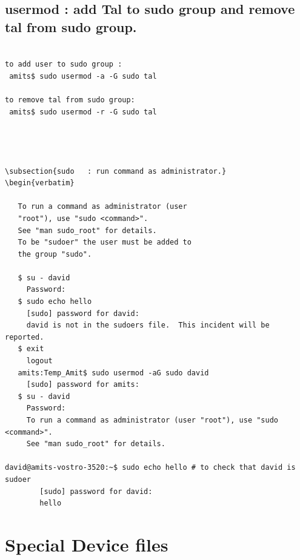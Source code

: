\documentclass[a4paper,12pt]{article}
\begin{document}
\subsection{usermod : add Tal to sudo group and remove tal from sudo group.}
\begin{verbatim}

to add user to sudo group : 
 amits$ sudo usermod -a -G sudo tal

to remove tal from sudo group:
 amits$ sudo usermod -r -G sudo tal
  



\subsection{sudo   : run command as administrator.}
\begin{verbatim}
       
   To run a command as administrator (user   
   "root"), use "sudo <command>".
   See "man sudo_root" for details.
   To be "sudoer" the user must be added to 
   the group "sudo".
   
   $ su - david
     Password: 
   $ sudo echo hello
     [sudo] password for david: 
     david is not in the sudoers file.  This incident will be reported.
   $ exit 
     logout
   amits:Temp_Amit$ sudo usermod -aG sudo david
     [sudo] password for amits: 
   $ su - david
     Password: 
     To run a command as administrator (user "root"), use "sudo <command>". 
     See "man sudo_root" for details.

david@amits-vostro-3520:~$ sudo echo hello # to check that david is sudoer
        [sudo] password for david: 
        hello                      

\end{verbatim}



\section{Special Device files }
\end{document}
